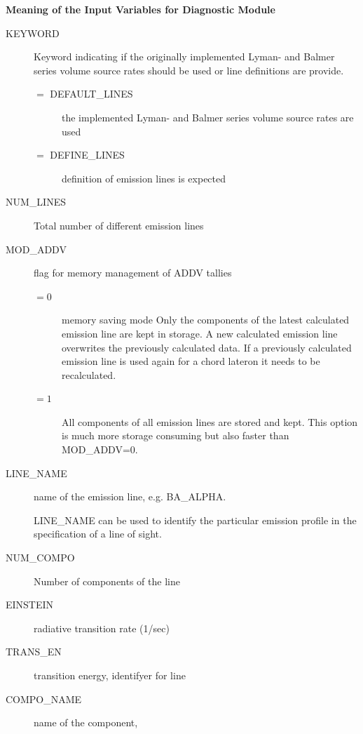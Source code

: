 \medskip

\textbf{Meaning of the Input Variables for Diagnostic Module}

\medskip

\begin{description}
  \item[KEYWORD] Keyword indicating if the originally implemented Lyman- and
        Balmer series volume source rates should be used or
        line definitions are provide.
        \begin{description}
          \item[$=$ DEFAULT\_LINES] the implemented Lyman- and
               Balmer series volume source rates are used
          \item[$=$ DEFINE\_LINES] definition of emission lines is expected
        \end{description}
  \item[NUM\_LINES] Total number of different emission lines
  \item[MOD\_ADDV] flag for memory management of ADDV tallies
        \begin{description}
          \item[$= 0$] memory saving mode
               Only the components of the latest calculated emission line
               are kept in storage. A new calculated emission line
               overwrites the previously calculated data. If a previously
               calculated emission line is used again for a chord lateron
               it needs to be recalculated.
          \item[$= 1$] All components of all emission lines are stored
               and kept. This option is much more storage consuming but
               also faster than MOD\_ADDV=0.
        \end{description}
   \item[LINE\_NAME] name of the emission line, e.g. BA\_ALPHA.

         LINE\_NAME can be used to identify the particular emission
         profile in the specification of a line of sight.
   \item[NUM\_COMPO] Number of components of the line
   \item[EINSTEIN] radiative transition rate (1/sec)
   \item[TRANS\_EN] transition energy, identifyer for line
   \item[COMPO\_NAME] name of the component,


\end{description}
